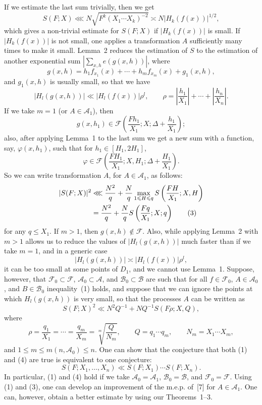 \documentclass[10pt]{article}
\begin{document}
If we estimate the last sum trivially, then we get
\begin{equation}
  S(F;X)\lll N\sqrt{F^k(X_1\cdots X_k)^{-2}}
  \asymp N\lvert H_k(f(x))\rvert^{1/2},
  \tag{2}
\end{equation}
which gives a non-trivial estimate for $S(F;X)$ if $\lvert H_k(f(x))\rvert$ is small. If $\lvert H_k(f(x))\rvert$ is not small, one applies a transformation $A$ sufficiently many times to make it small. Lemma~2 reduces the estimation of $S$ to the estimation of another exponential sum $\left|\sum_{x,h}e(g(x,h))\right|$, where
\[
  g(x,h)=h_1f_{x_1}(x)+\cdots+h_mf_{x_m}(x)+g_1(x,h),
\]
and $g_1(x,h)$ is usually small, so that we have
\[
  \lvert H_l(g(x,h))\rvert\ll\lvert H_l(f(x))\rvert\rho^l,
  \qquad
  \rho=\left|\frac{h_1}{X_1}\right|+\cdots+\left|\frac{h_n}{X_n}\right|.
\]
If we take $m=1$ (or $A\in\mathscr A_1$), then
\[
  g(x,h_1)\in\mathscr F\left(\frac{Fh_1}{X_1};X;\Delta+\frac{h_1}{X_1}\right);
\]
also, after applying Lemma~1 to the last sum we get a new sum with a function, say, $\varphi(x,h_1)$, such that for $h_1\in[H_1,2H_1]$,
\[
  \varphi\in\mathscr F\left(\frac{FH_1}{X_1};X,H_1;\Delta+\frac{H_1}{X_1}\right).
\]
So we can write transformation $A$, for $A\in\mathscr A_1$, as follows:
\begin{align}
  |S(F;X)|^2
  &\lll \frac{N^2}{q}+\frac Nq\max_{1\leqslant H\leqslant q}
      S\left(\frac{FH}{X_1};X,H\right) \notag\\
  &=\frac{N^2}{q}+\frac NqS\left(\frac{Fq}{X_1};X;q\right)
  \tag{3}
\end{align}
for any $q\leqslant X_1$. If $m>1$, then $g(x,h)\notin\mathscr F$. Also, while applying Lemma~2 with $m>1$ allows us to reduce the values of $\lvert H_l(g(x,h))\rvert$ much faster than if we take $m=1$, and in a generic case
\[
  \lvert H_l(g(x,h))\rvert\asymp\lvert H_l(f(x))\rvert\rho^l,
\]
it can be too small at some points of $D_1$, and we cannot use Lemma~1. Suppose, however, that $\mathscr F_0\subset\mathscr F$, $\mathscr A_0\subset\mathscr A$, and $\mathscr B_0\subset\mathscr B$ are such that for all $f\in\mathscr F_0$, $A\in\mathscr A_0$, and $B\in\mathscr B_0$ inequality~(1) holds, and suppose that we can ignore the points at which $H_l(g(x,h))$ is very small, so that the processes $A$ can be written as
\begin{equation}
  S(F;X)^2\ll N^2Q^{-1}+NQ^{-1}S(F\rho;X,Q),
  \tag{4}
\end{equation}
where
\[
  \rho=\frac{q_1}{X_1}=\cdots=\frac{q_m}{X_m}=\sqrt[m]{\frac Q{N_m}},
  \qquad Q=q_1\cdots q_m,
  \qquad N_m=X_1\cdots X_m,
\]
and $1\leqslant m\leqslant m(n,\mathscr A_0)\leqslant n$. One can show that the conjecture that both (1) and (4) are true is equivalent to one conjecture:
\[
  S(F;X_1,\ldots,X_n)\ll S(F;X_1)\cdots S(F;X_n).
\]
In particular, (1) and (4) hold if we take $\mathscr A_0=\mathscr A_1$, $\mathscr B_0=\mathscr B$, and $\mathscr F_0=\mathscr F$. Using (1) and (3), one can develop an improvement of the m.e.p. of~[7] for $A\in\mathscr A_1$. One can, however, obtain a better estimate by using our Theorems~1--3.
\end{document}
